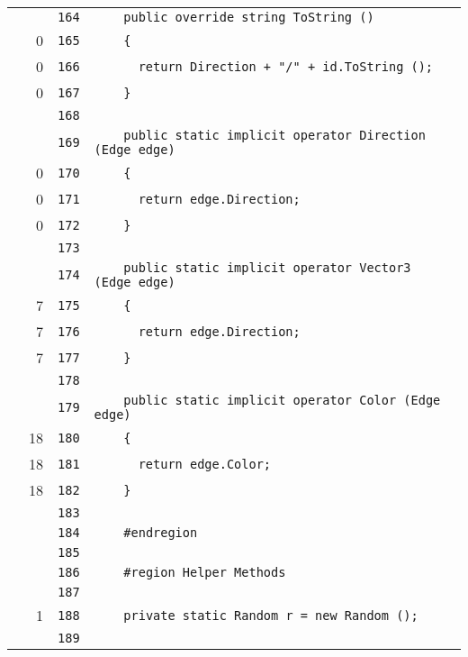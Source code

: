 \documentclass[a4paper,10pt]{article}
\begin{document}
\begin{longtable}[l]{lrrl}
\cellcolor{gray} &  & \verb~164~ & \verb~    public override string ToString ()~\\
\cellcolor{red} & 0 & \verb~165~ & \verb~    {~\\
\cellcolor{red} & 0 & \verb~166~ & \verb~      return Direction + "/" + id.ToString ();~\\
\cellcolor{red} & 0 & \verb~167~ & \verb~    }~\\
\cellcolor{gray} &  & \verb~168~ & \verb~~\\
\cellcolor{gray} &  & \verb~169~ & \verb~    public static implicit operator Direction (Edge edge)~\\
\cellcolor{red} & 0 & \verb~170~ & \verb~    {~\\
\cellcolor{red} & 0 & \verb~171~ & \verb~      return edge.Direction;~\\
\cellcolor{red} & 0 & \verb~172~ & \verb~    }~\\
\cellcolor{gray} &  & \verb~173~ & \verb~~\\
\cellcolor{gray} &  & \verb~174~ & \verb~    public static implicit operator Vector3 (Edge edge)~\\
\cellcolor{green} & 7 & \verb~175~ & \verb~    {~\\
\cellcolor{green} & 7 & \verb~176~ & \verb~      return edge.Direction;~\\
\cellcolor{green} & 7 & \verb~177~ & \verb~    }~\\
\cellcolor{gray} &  & \verb~178~ & \verb~~\\
\cellcolor{gray} &  & \verb~179~ & \verb~    public static implicit operator Color (Edge edge)~\\
\cellcolor{green} & 18 & \verb~180~ & \verb~    {~\\
\cellcolor{green} & 18 & \verb~181~ & \verb~      return edge.Color;~\\
\cellcolor{green} & 18 & \verb~182~ & \verb~    }~\\
\cellcolor{gray} &  & \verb~183~ & \verb~~\\
\cellcolor{gray} &  & \verb~184~ & \verb~    #endregion~\\
\cellcolor{gray} &  & \verb~185~ & \verb~~\\
\cellcolor{gray} &  & \verb~186~ & \verb~    #region Helper Methods~\\
\cellcolor{gray} &  & \verb~187~ & \verb~~\\
\cellcolor{green} & 1 & \verb~188~ & \verb~    private static Random r = new Random ();~\\
\cellcolor{gray} &  & \verb~189~ & \verb~~\\

\end{longtable}
\end{document}
